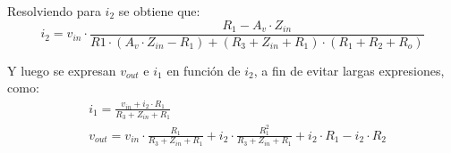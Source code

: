 Resolviendo para $i_2$ se obtiene que:
\begin{equation}
    i_2 = v_{in} \cdot \frac{R_1 - A_v \cdot Z_{in}}{R1 \cdot \left(A_v \cdot Z_{in} - R_1\right) + \left(R_3 + Z_{in} + R_1\right) \cdot \left(R_1 + R_2 + R_o\right)}
    \label{eq:i2}
\end{equation}

Y luego se expresan $v_{out}$ e $i_1$ en función de $i_2$, a fin de evitar largas expresiones, como:
\begin{align}
    &i_1 = \frac{v_{in} + i_2 \cdot R_1}{R_3 + Z_{in} + R_1} \\
    &v_{out} = v_{in} \cdot \frac{R_1}{R_3 + Z_{in} + R_1} + i_2 \cdot \frac{R_1^2}{R_3 + Z_{in} + R_1} + i_2 \cdot R_1 - i_2 \cdot R_2
    \label{eq:i1_and_vout}
\end{align}

